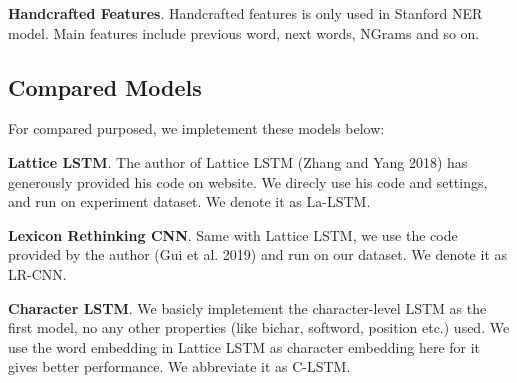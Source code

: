 \documentclass[letterpaper]{article} %
\begin{document}
\textbf{Handcrafted Features}. Handcrafted features is only used in Stanford NER model. Main features include previous word, next words, NGrams and so on. 



\subsection{Compared Models}



\begin{table}[t]
\caption{Hyperparameters}\smallskip
\centering
{}
\label{table2}
\end{table}

For compared purposed, we impletement these models below:

\textbf{Lattice LSTM}. The author of Lattice LSTM (Zhang and Yang 2018) has generously provided his code on website. We direcly use his code and settings, and run on experiment dataset. We denote it as La-LSTM.

\textbf{Lexicon Rethinking CNN}. Same with Lattice LSTM, we use the code provided by the author (Gui et al. 2019) and run on our dataset. We denote it as LR-CNN.

\textbf{Character LSTM}. We basicly impletement the character-level LSTM as the first model, no any other properties (like bichar, softword, position etc.) used. We use the word embedding in Lattice LSTM as character embedding here for it gives better performance. We abbreviate it as C-LSTM.
\end{document}
